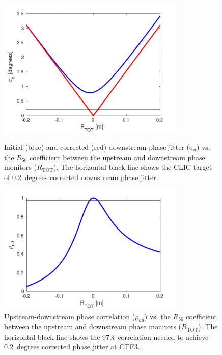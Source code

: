\begin{figure}
  \centering
  \includegraphics[width=0.8\textwidth]{Figures/propagation/jitVsR56}
  \caption{Initial (blue) and corrected (red) downstream phase jitter (\(\sigma_d\)) vs. the \(R_{56}\) coefficient between the upstream and downstream phase monitors (\(R_{\mathrm{TOT}}\)). The horizontal black line shows the CLIC target of 0.2~degrees corrected downstream phase jitter.}
  \label{f:jitVsR56}
  \includegraphics[width=0.8\textwidth]{Figures/propagation/corrVsR56}
  \caption{Upstream-downstream phase correlation (\(\rho_{ud}\)) vs. the \(R_{56}\) coefficient between the upstream and downstream phase monitors (\(R_{\mathrm{TOT}}\)). The horizontal black line shows the 97\% correlation needed to achieve 0.2~degrees corrected phase jitter at CTF3.}
  \label{f:corrVsR56}
\end{figure}

